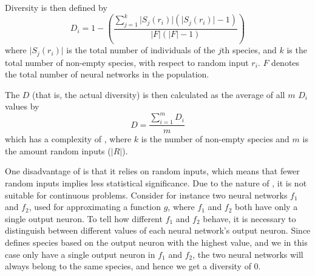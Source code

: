 Diversity is then defined by
%
\begin{equation*}\label{eq:sdi}
  D_i = 1 - \left(\frac{\sum_{j=1}^{k}\lvert S_j\left(r_i\right)\rvert\left(\lvert S_j\left(r_i\right)\rvert - 1\right)}{\lvert F\rvert \left(\lvert F\rvert - 1\right)}\right) 
\end{equation*}
%
where $\lvert S_j\left(r_i\right)\rvert$ is the total number of individuals of the $j$th species, and $k$ is the total number of non-empty species, with respect to random input $r_i$. %
$F$ denotes the total number of neural networks in the population. 

The \dia{} $D$ (that is, the actual diversity) is then calculated as the average of all $m$ $D_i$ values by
%
\[
D =\frac{\sum_{i=1}^m{D_i}}{m}
\]
%
which has a complexity of , where $k$ is the number of non-empty species and $m$ is the amount random inputs ($\lvert R \rvert$).

One disadvantage of \dia{} is that it relies on random inputs, which means that fewer random inputs implies less statistical significance. Due to the nature of \dia, it is not suitable for continuous problems.
Consider for instance two neural networks $f_1$ and $f_2$, used for approximating a function $g$, where $f_1$ and $f_2$ both have only a single output neuron.
To tell how different $f_1$ and $f_2$ behave, it is necessary to distinguish between different values of each neural network's output neuron.
Since \dia{} defines species based on the output neuron with the highest value, and we in this case only have a single output neuron in $f_1$ and $f_2$, the two neural networks will always belong to the same species, and hence we get a diversity of 0.  
